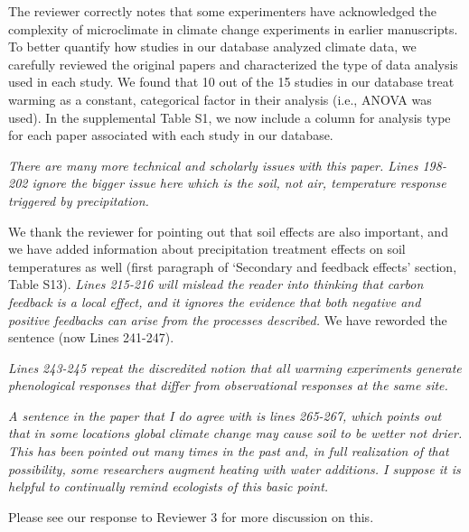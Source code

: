 \documentclass[11pt,a4paper]{letter}
\begin{document}
\begin{letter}{}
The reviewer correctly notes that some experimenters have acknowledged the complexity of microclimate in climate change experiments in earlier manuscripts. To better quantify how studies in our database analyzed climate data, we carefully reviewed the original papers and characterized the type of data analysis used in each study. We found that 10 out of the 15 studies in our database treat warming as a constant, categorical factor in their analysis (i.e., ANOVA was used). In the supplemental Table S1,   
we now include a column for analysis type for each paper associated with each study in our database. 
\par \emph{There are many more technical and scholarly issues with this paper.  Lines 198-202 ignore the bigger issue here which is the soil, not air, temperature response triggered by precipitation.}
\par We thank the reviewer for pointing out that soil effects are also important, and we have added information about precipitation treatment effects on soil temperatures as well (first paragraph of `Secondary and feedback effects' section, Table S13).
\emph  {Lines 215-216 will mislead the reader into thinking that carbon feedback is a local effect, and it ignores the evidence that both negative and positive feedbacks can arise from the processes described.}  
We have reworded the sentence (now Lines 241-247).

\emph {Lines 243-245 repeat the discredited notion that all warming experiments generate phenological responses that differ from observational responses at the same site. } 

\emph{A sentence in the paper that I do agree with is lines 265-267, which points out that in some locations global climate change may cause soil to be wetter not drier.  This has been pointed out many times in the past and, in full realization of that possibility, some researchers augment heating with water additions.  I suppose it is helpful to continually remind ecologists of this basic point.}
\par Please see our response to Reviewer 3 for more discussion on this.


\end{letter}
\end{document}
